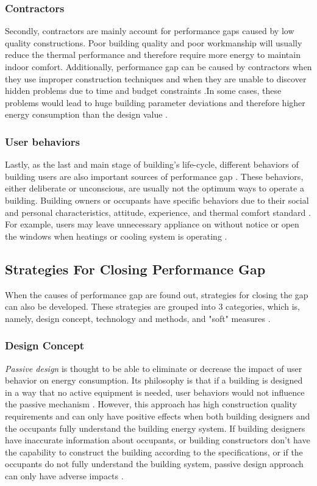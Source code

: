 \documentclass[11pt, a4paper]{article}
\theoremstyle{definition}
\begin{document}
		\subsubsection{Contractors}
		Secondly, contractors are mainly account for performance gaps caused by low quality constructions. Poor building quality and poor workmanship will usually reduce the thermal performance and therefore require more energy to maintain indoor comfort. Additionally, performance gap can be caused by contractors when they use improper construction techniques and when they are unable to discover hidden problems due to time and budget constraints \cite{DEWILDE201440}.In some cases, these problems would lead to huge building parameter deviations and therefore higher energy consumption than the design value \cite{FREI2017421,DEWILDE201440}. 

		\subsubsection{User behaviors}
		Lastly, as the last and main stage of building's life-cycle, different behaviors of building users are also important sources of performance gap \cite{ZOU2018165}. These behaviors, either deliberate or unconscious, are usually not the optimum ways to operate a building. Building owners or occupants have specific behaviors due to their social and personal characteristics, attitude, experience, and thermal comfort standard \cite{userevaluations,LAWRENCE2016651}. For example, users may leave unnecessary appliance on without notice or open the windows when heatings or cooling system is operating \cite{FREI2017421}.

	\subsection{Strategies For Closing Performance Gap} 
		When the causes of performance gap are found out, strategies for closing the gap can also be developed. These strategies are grouped into 3 categories, which is, namely, design concept, technology and methods, and "soft" measures \cite{ZOU2018165}.

		\subsubsection{Design Concept}
			\textit{Passive design} is thought to be able to eliminate or decrease the impact of user behavior on energy consumption. Its philosophy is that if a building is designed in a way that no active equipment is needed, user behaviors would not influence the passive mechanism \cite{BLIGHT2013183,NORFORD1994121}. However, this approach has high construction quality requirements and can only have positive effects when both building designers and the occupants fully understand the building energy system. If building designers have inaccurate information about occupants, or building constructors don't have the capability to construct the building according to the specifications, or if the occupants do not fully understand the building system, passive design approach can only have adverse impacts \cite{ZOU2018165}.\\
\end{document}
